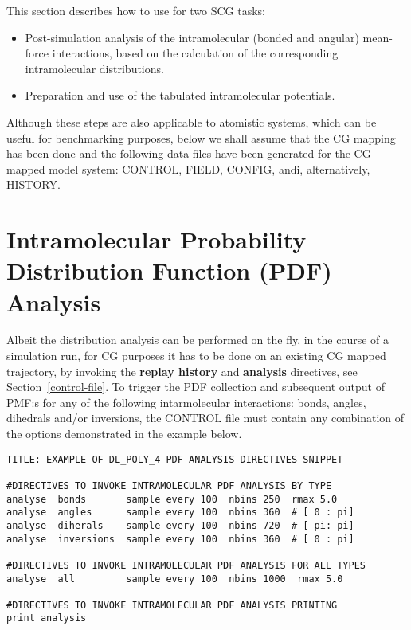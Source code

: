 This section describes how to use \D for two SCG tasks:

\begin{itemize}
\item Post-simulation analysis of the intramolecular (bonded and angular)
mean-force interactions, based on the calculation of the corresponding
intramolecular distributions.
\item Preparation and use of the tabulated intramolecular potentials.
\end{itemize}

 Although these steps are also applicable to
atomistic systems, which can be useful for benchmarking purposes,
below we shall assume that the CG mapping has been done and the following
data files have been generated for the CG mapped model system:
CONTROL, FIELD, CONFIG, andi, alternatively, HISTORY.

\section{Intramolecular Probability Distribution Function (PDF) Analysis}
\label{IPDF-analysis}

Albeit the distribution analysis can be performed on the fly,
in the course of a simulation run, for CG purposes it has
to be done on an existing CG mapped trajectory, by invoking
the {\bf replay history} and {\bf analysis} directives,
see Section~\ref{control-file}.
To trigger the PDF collection and subsequent output of PMF:s
for any of the following intarmolecular interactions: bonds,
angles, dihedrals and/or inversions, the CONTROL file must
contain any combination of the options demonstrated
in the example below.

\begin{verbatim}
TITLE: EXAMPLE OF DL_POLY_4 PDF ANALYSIS DIRECTIVES SNIPPET

#DIRECTIVES TO INVOKE INTRAMOLECULAR PDF ANALYSIS BY TYPE
analyse  bonds       sample every 100  nbins 250  rmax 5.0
analyse  angles      sample every 100  nbins 360  # [ 0 : pi]
analyse  diherals    sample every 100  nbins 720  # [-pi: pi]
analyse  inversions  sample every 100  nbins 360  # [ 0 : pi]

#DIRECTIVES TO INVOKE INTRAMOLECULAR PDF ANALYSIS FOR ALL TYPES
analyse  all         sample every 100  nbins 1000  rmax 5.0

#DIRECTIVES TO INVOKE INTRAMOLECULAR PDF ANALYSIS PRINTING
print analysis
\end{verbatim}

